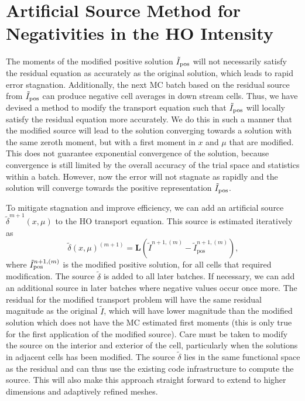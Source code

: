 \section{Artificial Source Method for Negativities in the HO Intensity}

The moments of the modified positive solution $\tilde I_{{\text{pos}}}$ will
not necessarily satisfy the residual equation as accurately as the original solution, which leads to
rapid error stagnation.  Additionally, the next MC batch based on the residual source from
$\tilde I_{{\text{pos}}}$ can produce negative cell averages in down stream cells.
Thus, we have devised
a method to modify the transport equation such that $\tilde I_{{\text{pos}}}$ will locally satisfy the
residual equation more accurately.  We do this in such a manner that the
modified source will lead to the solution converging towards a solution with the same
zeroth moment, but with a first moment in $x$ and $\mu$ that are modified.  This does not
guarantee exponential convergence of the solution, because convergence is still limited by
the overall accuracy of the trial space and statistics within a batch.  However, now the error will not stagnate as rapidly
and the solution will converge towards the positive representation $\tilde I_{{\text{pos}}}$.

To mitigate stagnation and improve efficiency, we can add an artificial source
$\tilde\delta^{m+1}(x,\mu)$ to the HO transport equation.
This source is estimated iteratively as
\begin{equation*}
    \tilde\delta(x,\mu)^{(m+1)} = \mathbf{L}(\tilde{I}^{n+1,(m)} -
    \tilde{I}^{n+1,(m)}_{\text{pos}}),
\end{equation*}
where $\tilde{I}_{{\text{pos}}}^{n+1,(m)}$ is the modified positive solution, for all cells that required
modification.  The source $\tilde
\delta$ is added to all later batches.  If necessary, we can add an additional source in
later batches where negative values occur once more. The residual for the modified
transport problem will have the same residual magnitude as the original $\tilde I$, which
will have lower magnitude than the modified solution which does not have the MC estimated
first moments (this is only true for the first application of the modified source).  Care
must be taken to modify the source on the interior and exterior of the cell,
particularly when the solutions in adjacent cells has been modified.  The source
$\tilde\delta$ lies in the same functional space as the residual and can thus use the
existing code infrastructure to compute the source.  This will also make this approach
straight forward to extend to higher dimensions and adaptively refined meshes.  


